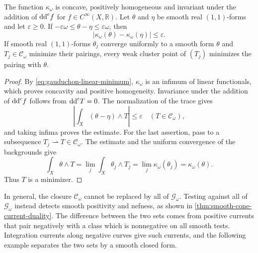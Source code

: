 \begin{corollary}\label{cor:gauduchon-threshold-continuity}
The function $\kappa_\omega$ is concave, positively homogeneous and invariant under the addition of $\mathrm{dd}^{\mathrm{c}} f$ for $f\in C^\infty(X,\mathbb R)$. Let $\theta$ and $\eta$ be smooth real $(1,1)$-forms and let $\varepsilon\geq0$. If $-\varepsilon\omega\leq\theta-\eta\leq\varepsilon\omega$, then
\[
 |\kappa_\omega(\theta)-\kappa_\omega(\eta)|\leq\varepsilon.
\]
If smooth real $(1,1)$-forms $\theta_j$ converge uniformly to a smooth form $\theta$ and $T_j\in\mathscr C_\omega$ minimize their pairings, every weak cluster point of $(T_j)$ minimizes the pairing with $\theta$.
\end{corollary}
\begin{proof}
By \eqref{eq:gauduchon-linear-minimum}, $\kappa_\omega$ is an infimum of linear functionals, which proves concavity and positive homogeneity. Invariance under the addition of $\mathrm{dd}^{\mathrm{c}} f$ follows from $\mathrm{dd}^{\mathrm{c}} T=0$. The normalization of the trace gives
\[
 \left|\int_X(\theta-\eta)\wedge T\right|\leq\varepsilon
 \quad(T\in\mathscr C_\omega),
\]
and taking infima proves the estimate. For the last assertion, pass to a subsequence $T_j\rightharpoonup T\in\mathscr C_\omega$. The estimate and the uniform convergence of the backgrounds give
\[
 \int_X\theta\wedge T
 =\lim_j\int_X\theta_j\wedge T_j
 =\lim_j\kappa_\omega(\theta_j)=\kappa_\omega(\theta).
\]
Thus $T$ is a minimizer.
\end{proof}

In general, the closure $\mathscr C_\omega$ cannot be replaced by all of $\mathscr G_\omega$. Testing against all of $\mathscr G_\omega$ instead detects smooth positivity and nefness, as shown in \cref{thm:smooth-cone-current-duality}. The difference between the two sets comes from positive currents that pair negatively with a class which is nonnegative on all smooth tests. Integration currents along negative curves give such currents, and the following example separates the two sets by a smooth closed form.

